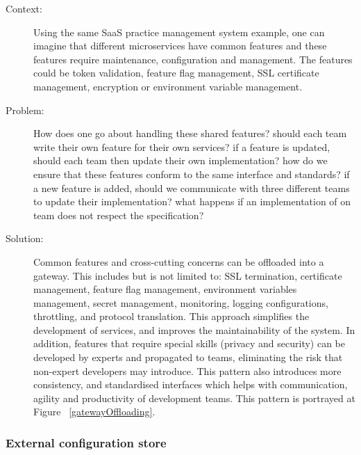 \documentclass{bmcart}
\begin{document}
\begin{description}
  \item[Context:] Using the same SaaS practice management system example, one can imagine that different microservices have common features and these features require maintenance, configuration and management. The features could be token validation, feature flag management, SSL certificate management, encryption or environment variable management. 
  \item[Problem:] How does one go about handling these shared features? should each team write their own feature for their own services? if a feature is updated, should each team then update their own implementation? how do we ensure that these features conform to the same interface and standards? if a new feature is added, should we communicate with three different teams to update their implementation? what happens if an implementation of on team does not respect the specification?
  \item[Solution:] Common features and cross-cutting concerns can be offloaded into a gateway. This includes but is not limited to: SSL termination, certificate management, feature flag management, environment variables management, secret management, monitoring, logging configurations, throttling, and protocol translation. This approach simplifies the development of services, and improves the maintainability of the system.  In addition, features that require special skills (privacy and security) can be developed by experts and propagated to teams, eliminating the risk that non-expert developers may introduce. This pattern also introduces more consistency, and standardised interfaces which helps with communication, agility and productivity of development teams. This pattern is portrayed at Figure ~\ref{gatewayOffloading}.   

\end{description}


\subsubsection{External configuration store}
\end{document}
